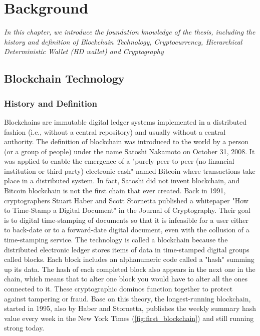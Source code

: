 \setlength{\abovedisplayskip}{0pt}
\setlength{\belowdisplayskip}{0pt}
\setlength{\abovedisplayshortskip}{0pt}
\setlength{\belowdisplayshortskip}{0pt}

\chapter{Background}
\label{chap:background}
\textit{In this chapter, we introduce the foundation knowledge of the thesis, including the history and definition of Blockchain Technology, Cryptocurrency,
  Hierarchical Deterministic Wallet (HD wallet) and Cryptography}
\minitoc

\section{Blockchain Technology}

\subsection{History and Definition}

Blockchains are immutable digital ledger systems implemented in a distributed fashion (i.e., without a central repository) and usually without a central authority.
The definition of blockchain was introduced to the world by a person (or a group of people) under the name Satoshi Nakamoto on October 31, 2008.
It was applied to enable the emergence of a "purely peer-to-peer (no financial institution or third party) electronic cash" named Bitcoin where transactions take place in a distributed system.
In fact, Satoshi did not invent blockchain, and Bitcoin blockchain is not the first chain that ever created.
Back in 1991, cryptographers Stuart Haber and Scott Stornetta published a whitepaper "How to Time-Stamp a Digital Document" in the Journal of Cryptography.
Their goal is to digital time-stamping of documents so that it is infeasible for a user either to back-date or to a forward-date digital document, even with the collusion of a time-stamping service.
The technology is called a blockchain because the distributed electronic ledger stores items of data in time-stamped digital groups called blocks. Each block includes an alphanumeric code called a "hash" summing up its data. The hash of each completed block also appears in the next one in the chain, which means that to alter one block you would have to alter all the ones connected to it. These cryptographic dominos function together to protect against tampering or fraud.
Base on this theory, the longest-running blockchain, started in 1995, also by Haber and Stornetta, publishes the weekly summary hash value every week in the New York Times (\autoref{fig:first_blockchain}) and still running strong today.

